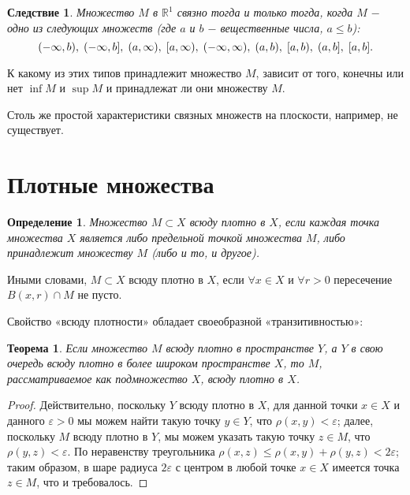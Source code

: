 \documentclass{article}
\newtheorem{theorem}{Теорема}[section]
\newtheorem{definition}{Определение}[section]
\newtheorem*{consequence}{Следствие}
\begin{document}
\begin{consequence}
Множество \(M\) в \(\mathbb{R}^1\) связно тогда и только тогда, когда \(M\) \(-\) одно из следующих множеств (где \(a\) и \(b\) \(-\) вещественные числа, \(a \leq b\)):
\[
(-\infty, b), \hspace{1mm} (-\infty, b], \hspace{1mm} (a, \infty), \hspace{1mm} [a, \infty), \hspace{1mm} (-\infty, \infty), \hspace{1mm} (a, b), \hspace{1mm} [a, b), \hspace{1mm} (a, b], \hspace{1mm} [a, b].
\]
\end{consequence}

К какому из этих типов принадлежит множество \(M\), зависит от того, конечны или нет \(\inf M\) и \(\sup M\) и принадлежат ли они множеству \(M\).

Столь же простой характеристики связных множеств на плоскости, например, не существует.

\section{Плотные множества}

\begin{definition}
Множество \(M \subset X\) всюду плотно в \(X\), если каждая точка множества \(X\) является либо предельной точкой множества \(M\), либо принадлежит множеству \(M\) (либо и то, и другое).
\end{definition}

Иными словами, \(M \subset X\) всюду плотно в \(X\), если \(\forall x \in X\) и \(\forall r > 0\) пересечение \(B(x, r) \cap M\) не пусто.

Свойство «всюду плотности» обладает своеобразной «транзитивностью»:

\begin{theorem}
Если множество \(M\) всюду плотно в пространстве \(Y\), а \(Y\) в свою очередь всюду плотно в более широком пространстве \(X\), то \(M\), рассматриваемое как подмножество \(X\), всюду плотно в \(X\).
\end{theorem}

\begin{proof}
Действительно, поскольку \(Y\) всюду плотно в \(X\), для данной точки \(x \in X\) и данного \(\varepsilon > 0\) мы можем найти такую точку \(y \in Y\), что \(\rho(x, y) < \varepsilon\); далее, поскольку \(M\) всюду плотно в \(Y\), мы можем указать такую точку \(z \in M\), что \(\rho(y, z) < \varepsilon\). По неравенству треугольника \(\rho(x, z) \leq \rho(x, y) + \rho(y, z) < 2\varepsilon\); таким образом, в шаре радиуса \(2\varepsilon\) с центром в любой точке \(x \in X\) имеется точка \(z \in M\), что и требовалось.
\end{proof}
\end{document}
